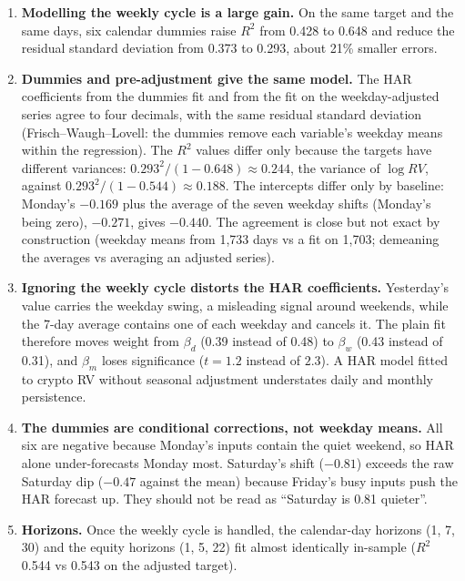 \documentclass[11pt]{article}
\numberwithin{equation}{section}
\begin{document}
\begin{enumerate}
\item \textbf{Modelling the weekly cycle is a large gain.} On the same target and the same days, six calendar dummies raise $R^2$ from 0.428 to 0.648 and reduce the residual standard deviation from 0.373 to 0.293, about 21\% smaller errors.

\item \textbf{Dummies and pre-adjustment give the same model.} The HAR coefficients from the dummies fit and from the fit on the weekday-adjusted series agree to four decimals, with the same residual standard deviation (Frisch--Waugh--Lovell: the dummies remove each variable's weekday means within the regression). The $R^2$ values differ only because the targets have different variances: $0.293^2/(1-0.648) \approx 0.244$, the variance of $\log RV$, against $0.293^2/(1-0.544) \approx 0.188$. The intercepts differ only by baseline: Monday's $-0.169$ plus the average of the seven weekday shifts (Monday's being zero), $-0.271$, gives $-0.440$. The agreement is close but not exact by construction (weekday means from 1,733 days vs a fit on 1,703; demeaning the averages vs averaging an adjusted series).

\item \textbf{Ignoring the weekly cycle distorts the HAR coefficients.} Yesterday's value carries the weekday swing, a misleading signal around weekends, while the 7-day average contains one of each weekday and cancels it. The plain fit therefore moves weight from $\beta_d$ (0.39 instead of 0.48) to $\beta_w$ (0.43 instead of 0.31), and $\beta_m$ loses significance ($t = 1.2$ instead of $2.3$). A HAR model fitted to crypto RV without seasonal adjustment understates daily and monthly persistence.

\item \textbf{The dummies are conditional corrections, not weekday means.} All six are negative because Monday's inputs contain the quiet weekend, so HAR alone under-forecasts Monday most. Saturday's shift ($-0.81$) exceeds the raw Saturday dip ($-0.47$ against the mean) because Friday's busy inputs push the HAR forecast up. They should not be read as ``Saturday is 0.81 quieter''.

\item \textbf{Horizons.} Once the weekly cycle is handled, the calendar-day horizons (1, 7, 30) and the equity horizons (1, 5, 22) fit almost identically in-sample ($R^2$ 0.544 vs 0.543 on the adjusted target).
\end{enumerate}
\end{document}
